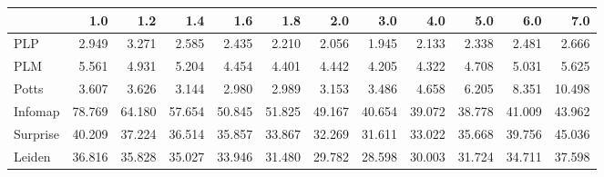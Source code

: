 \begin{tabular}{lrrrrrrrrrrr}
\toprule
{} &    1.0 &    1.2 &    1.4 &    1.6 &    1.8 &    2.0 &    3.0 &    4.0 &    5.0 &    6.0 &    7.0 \\
\midrule
PLP      &  2.949 &  3.271 &  2.585 &  2.435 &  2.210 &  2.056 &  1.945 &  2.133 &  2.338 &  2.481 &  2.666 \\
PLM      &  5.561 &  4.931 &  5.204 &  4.454 &  4.401 &  4.442 &  4.205 &  4.322 &  4.708 &  5.031 &  5.625 \\
Potts    &  3.607 &  3.626 &  3.144 &  2.980 &  2.989 &  3.153 &  3.486 &  4.658 &  6.205 &  8.351 & 10.498 \\
Infomap  & 78.769 & 64.180 & 57.654 & 50.845 & 51.825 & 49.167 & 40.654 & 39.072 & 38.778 & 41.009 & 43.962 \\
Surprise & 40.209 & 37.224 & 36.514 & 35.857 & 33.867 & 32.269 & 31.611 & 33.022 & 35.668 & 39.756 & 45.036 \\
Leiden   & 36.816 & 35.828 & 35.027 & 33.946 & 31.480 & 29.782 & 28.598 & 30.003 & 31.724 & 34.711 & 37.598 \\
\bottomrule
\end{tabular}
